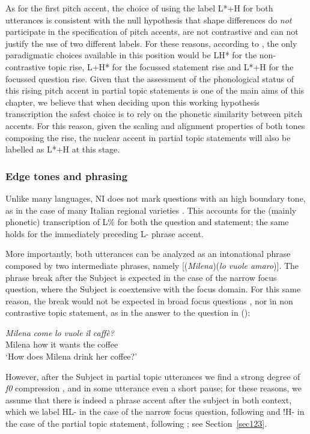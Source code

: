 As for the first pitch accent, the choice of using the label L*+H for both utterances is consistent with the null hypothesis that shape differences do \textit{not} participate in the specification of pitch accents, are not contrastive and can not justify the use of two different labels. For these reasons, according to \citet{dimperio2008phonetics}, the only paradigmatic choices available in this position would be LH* for the non-contrastive topic rise, L+H* for the focussed statement rise and L*+H for the focussed question rise. Given that the assessment of the phonological status of this rising pitch accent in partial topic statements is one of the main aims of this chapter, we believe that when deciding upon this working hypothesis transcription the safest choice is to rely on the phonetic similarity between pitch accents. For this reason, given the scaling and alignment properties of both tones composing the rise, the nuclear accent in partial topic statements will also be labelled as L*+H at this stage.

\subsubsection{Edge tones and phrasing}\label{sec2123}
Unlike many languages, NI does not mark questions with an high boundary tone, as in the case of many Italian regional varieties \citep{savino2012intonation}. This accounts for the (mainly phonetic) transcription of L\% for both the question and statement; the same holds for the immediately preceding L- phrase accent. 

More importantly, both utterances can be analyzed as an intonational phrase composed by two intermediate phrases, namely [(\textit{Milena})(\textit{lo vuole amaro})]. The phrase break after the Subject is expected in the case of the narrow focus question, where the Subject is coextensive with the focus domain. For this same reason, the break would not be expected in broad focus questions \citep{dimperio2005intonational,frota2007phonetics}, nor in non contrastive topic statement, as in the answer to the question in ():

\ea
\gll \textit{Milena} \textit{come} \textit{lo} \textit{vuole} \textit{il} \textit{caffè?}\\
Milena how it wants the coffee\\
\glt ‘How does Milena drink her coffee?’
\z

However, after the Subject in partial topic utterances we find a strong degree of \textit{f0} compression \citep{dimperio2011phrasing}, and in some utterance even a short pause; for these reasons, we assume that there is indeed a phrase accent after the subject in both context, which we label HL- in the case of the narrow focus question, following \citet{dimperio2002italian} and !H- in the case of the partial topic statement, following \citet{dimperio2011phrasing}; see Section~\ref{sec123}.

